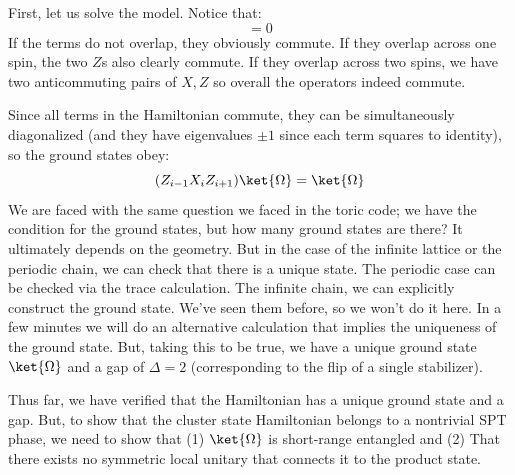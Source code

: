 First, let us solve the model. Notice that:
\begin{equation}
    [Z_{i-1}X_iZ_{i+1}, Z_{j-1}X_jZ_{j+1}] = 0
\end{equation}
If the terms do not overlap, they obviously commute. If they overlap across one spin, the two $Z$s also clearly commute. If they overlap across two spins, we have two anticommuting pairs of $X, Z$ so overall the operators indeed commute.

Since all terms in the Hamiltonian commute, they can be simultaneously diagonalized (and they have eigenvalues $\pm 1$ since each term squares to identity), so the ground states obey:
\begin{equation}
    (Z_{i-1}X_iZ_{i+1})\ket{\Omega} = \ket{\Omega}
\end{equation}
We are faced with the same question we faced in the toric code; we have the condition for the ground states, but how many ground states are there? It ultimately depends on the geometry. But in the case of the infinite lattice or the periodic chain, we can check that there is a unique state. The periodic case can be checked via the trace calculation. The infinite chain, we can explicitly construct the ground state. We've seen them before, so we won't do it here. In a few minutes we will do an alternative calculation that implies the uniqueness of the ground state. But, taking this to be true, we have a unique ground state $\ket{\Omega}$ and a gap of $\Delta = 2$ (corresponding to the flip of a single stabilizer).

Thus far, we have verified that the Hamiltonian has a unique ground state and a gap. But, to show that the cluster state Hamiltonian belongs to a nontrivial SPT phase, we need to show that (1) $\ket{\Omega}$ is short-range entangled and (2) That there exists no symmetric local unitary that connects it to the product state.

